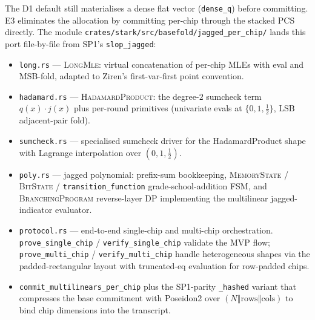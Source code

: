 The D1 default still materialises a dense flat vector
(\texttt{dense\_q}) before committing.  E3 eliminates the
allocation by committing per-chip through the stacked PCS directly.
The module
\texttt{crates/stark/src/basefold/jagged\_per\_chip/} lands this
port file-by-file from SP1's \texttt{slop\_jagged}:
\begin{itemize}
  \item \texttt{long.rs} --- \textsc{LongMle}: virtual
        concatenation of per-chip MLEs with eval and MSB-fold,
        adapted to Ziren's first-var-first point convention.
  \item \texttt{hadamard.rs} --- \textsc{HadamardProduct}: the
        degree-$2$ sumcheck term $q(x) \cdot j(x)$ plus per-round
        primitives (univariate evals at $\{0, 1, \tfrac{1}{2}\}$,
        LSB adjacent-pair fold).
  \item \texttt{sumcheck.rs} --- specialised sumcheck driver for
        the HadamardProduct shape with Lagrange interpolation over
        $(0, 1, \tfrac{1}{2})$.
  \item \texttt{poly.rs} --- jagged polynomial: prefix-sum
        bookkeeping, \textsc{MemoryState} / \textsc{BitState} /
        \texttt{transition\_function} grade-school-addition FSM,
        and \textsc{BranchingProgram} reverse-layer DP implementing
        the multilinear jagged-indicator evaluator.
  \item \texttt{protocol.rs} --- end-to-end single-chip and
        multi-chip orchestration.  \texttt{prove\_single\_chip} /
        \texttt{verify\_single\_chip} validate the MVP flow;
        \texttt{prove\_multi\_chip} / \texttt{verify\_multi\_chip}
        handle heterogeneous shapes via the padded-rectangular
        layout with truncated-eq evaluation for row-padded chips.
  \item \texttt{commit\_multilinears\_per\_chip} plus the
        SP1-parity \texttt{\_hashed} variant that compresses the
        base commitment with Poseidon2 over
        $(N \mathbin\Vert \mathrm{rows} \mathbin\Vert
        \mathrm{cols})$ to bind chip dimensions into the
        transcript.
\end{itemize}

